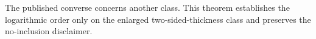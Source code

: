 The published converse concerns another class.  This theorem establishes the logarithmic order only on the enlarged two-sided-thickness class and preserves the no-inclusion disclaimer.